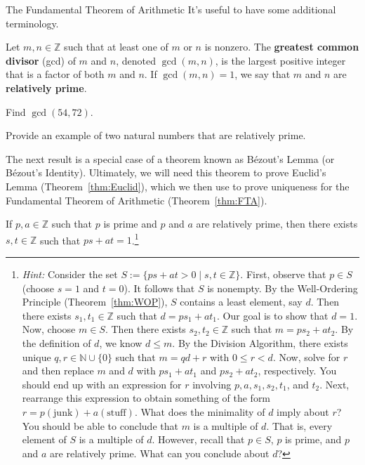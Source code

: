 \begin{section}{The Fundamental Theorem of Arithmetic}
It's useful to have some additional terminology.

\begin{definition}
Let $m,n\in\mathbb{Z}$ such that at least one of $m$ or $n$ is nonzero.  The \textbf{greatest common divisor} (gcd) of $m$ and $n$, denoted $\gcd(m,n)$, is the largest positive integer that is a factor of both $m$ and $n$. If $\gcd(m,n)=1$, we say that $m$ and $n$ are \textbf{relatively prime}.
\end{definition}

\begin{exercise}
Find $\gcd(54,72)$.
\end{exercise}

\begin{exercise}
Provide an example of two natural numbers that are relatively prime.
\end{exercise}

The next result is a special case of a theorem known as B\'ezout's Lemma (or B\'ezout's Identity). Ultimately, we will need this theorem to prove Euclid's Lemma (Theorem~\ref{thm:Euclid}), which we then use to prove uniqueness for the Fundamental Theorem of Arithmetic (Theorem~\ref{thm:FTA}).

\begin{lemma}\label{lem:Bezout}
If $p,a\in\mathbb{Z}$ such that $p$ is prime and $p$ and $a$ are relatively prime, then there exists $s,t\in\mathbb{Z}$ such that $ps+at=1$.\footnote{\emph{Hint:} Consider the set $S:=\{ps+at> 0\mid s,t\in \mathbb{Z}\}$. First, observe that $p\in S$ (choose $s=1$ and $t=0$). It follows that $S$ is nonempty. By the Well-Ordering Principle (Theorem~\ref{thm:WOP}), $S$ contains a least element, say $d$. Then there exists $s_1,t_1\in \mathbb{Z}$ such that $d=ps_1+at_1$. Our goal is to show that $d=1$. Now, choose $m\in S$. Then there exists $s_2,t_2\in \mathbb{Z}$ such that $m=ps_2+at_2$. By the definition of $d$, we know $d\leq m$. By the Division Algorithm, there exists unique $q,r\in \mathbb{N}\cup\{0\}$ such that $m=qd+r$ with $0\leq r < d$. Now, solve for $r$ and then replace $m$ and $d$ with $ps_1+at_1$ and $ps_2+at_2$, respectively.  You should end up with an expression for $r$ involving $p, a, s_1, s_2, t_1$, and $t_2$.  Next, rearrange this expression to obtain something of the form $r=p(\text{junk})+a(\text{stuff})$.  What does the minimality of $d$ imply about $r$?  You should be able to conclude that $m$ is a multiple of $d$.  That is, every element of $S$ is a multiple of $d$.  However, recall that $p\in S$, $p$ is prime, and $p$ and $a$ are relatively prime.  What can you conclude about $d$?}
\end{lemma}


\end{section}
